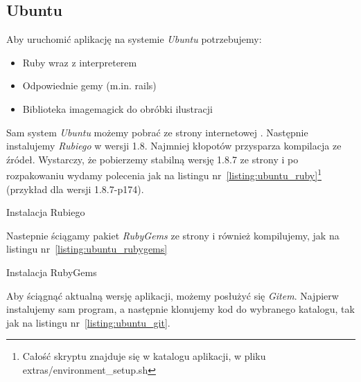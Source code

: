 \documentclass[a4paper,12pt]{article}
\begin{document}
\subsection{Ubuntu}
Aby uruchomić aplikację na systemie \emph{Ubuntu} potrzebujemy:
\begin{itemize}
  \item{Ruby wraz z interpreterem}
  \item{Odpowiednie gemy (m.in. rails)}
  \item{Biblioteka imagemagick do obróbki ilustracji}
\end{itemize}


Sam system \emph{Ubuntu} możemy pobrać ze strony internetowej \cite{ubuntu}.
Następnie instalujemy \emph{Rubiego} w wersji 1.8. Najmniej kłopotów przysparza kompilacja ze
źródeł. Wystarczy, że pobierzemy stabilną wersję 1.8.7 ze strony \cite{ruby-package} i po
rozpakowaniu wydamy polecenia jak na listingu nr~\ref{listing:ubuntu_ruby}\footnote{Całość
skryptu znajduje się w katalogu aplikacji, w pliku extras/environment\_setup.sh}
(przykład dla wersji 1.8.7-p174).

\begin{listing}
  
  \caption{Instalacja Rubiego}
  \label{listing:ubuntu_ruby}
\end{listing}

Nastepnie ściągamy pakiet \emph{RubyGems} ze strony \cite{rubygems} i również kompilujemy,
jak na listingu nr~\ref{listing:ubuntu_rubygems}

\begin{listing}
  
  \caption{Instalacja RubyGems}
  \label{listing:ubuntu_rubygems}
\end{listing}

%

Aby ściągnąć aktualną wersję aplikacji, możemy posłużyć się \emph{Gitem}.
Najpierw instalujemy sam program, a następnie klonujemy kod do wybranego katalogu,
tak jak na listingu nr~\ref{listing:ubuntu_git}.
\end{document}
